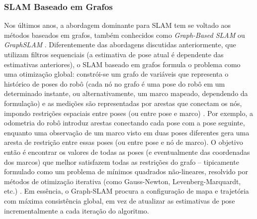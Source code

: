         
        \subsubsection{SLAM Baseado em Grafos}
        
        Nos últimos anos, a abordagem dominante para SLAM tem se voltado aos métodos baseados em grafos, também conhecidos como \textit{Graph-Based SLAM} ou \textit{GraphSLAM} \cite{Grisetti2010}\cite{Labbe2014}. Diferentemente das abordagens discutidas anteriormente, que utilizam filtros sequenciais (a estimativa de pose atual é dependente das estimativas anteriores), o SLAM baseado em grafos formula o problema como uma otimização global: constrói-se um grafo de variáveis que representa o histórico de poses do robô (cada nó no grafo é uma pose do robô em um determinado instante, ou alternativamente, um marco mapeado, dependendo da formulação) e as medições são representadas por arestas que conectam os nós, impondo restrições espaciais entre poses (ou entre pose e marco) \cite{Labbe2014}. Por exemplo, a odometria do robô introduz arestas conectando cada pose com a pose seguinte, enquanto uma observação de um marco visto em duas poses diferentes gera uma aresta de restrição entre essas poses (ou entre pose e nó de marco). O objetivo então é encontrar os valores de todas as poses (e eventualmente das coordenadas dos marcos) que melhor satisfazem todas as restrições do grafo – tipicamente formulado como um problema de mínimos quadrados não-lineares, resolvido por métodos de otimização iterativa (como Gauss-Newton, Levenberg-Marquardt, etc.) \cite{Zhang2021}. Em essência, o Graph-SLAM procura a configuração de mapa e trajetória com máxima consistência global, em vez de atualizar as estimativas de pose incrementalmente a cada iteração do algoritmo.
        
